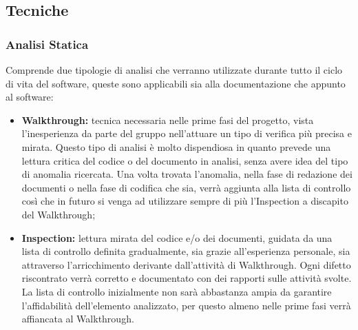 	\subsection{Tecniche}
		\subsubsection{Analisi Statica}
		Comprende due tipologie di analisi che verranno utilizzate durante tutto il ciclo di vita del software, queste sono applicabili sia alla documentazione che appunto al software:
			\begin{itemize}
				\item \textbf{Walkthrough:} tecnica necessaria nelle prime fasi del progetto, vista l'inesperienza da parte del gruppo nell'attuare un tipo di verifica più precisa e mirata. Questo tipo di analisi è molto dispendiosa in quanto prevede una lettura critica del codice o del documento in analisi, senza avere idea del tipo di anomalia ricercata. Una volta trovata l'anomalia, nella fase di redazione dei documenti o nella fase di codifica che sia, verrà aggiunta alla lista di controllo così che in futuro si venga ad utilizzare sempre di più l'Inspection a discapito del Walkthrough;
				\item \textbf{Inspection:} lettura mirata del codice e/o dei documenti, guidata da una
lista di controllo definita gradualmente, sia grazie all'esperienza personale, sia attraverso l'arricchimento derivante dall'attività di Walkthrough. Ogni difetto riscontrato verrà corretto e documentato con dei rapporti sulle attività svolte. La lista di controllo inizialmente non sarà abbastanza ampia da garantire l'affidabilità dell'elemento analizzato, per questo almeno nelle prime fasi verrà affiancata al Walkthrough.
			\end{itemize}

